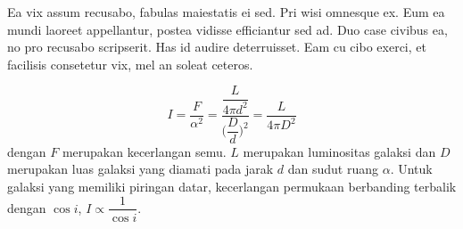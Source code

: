 	Ea vix assum recusabo, fabulas maiestatis ei sed. Pri wisi omnesque ex. Eum ea mundi laoreet appellantur, postea vidisse efficiantur sed ad. Duo case civibus ea, no pro recusabo scripserit. Has id audire deterruisset. Eam cu cibo exerci, et facilisis consetetur vix, mel an soleat ceteros.

\begin{equation} \label{kecerlangan}
I=\dfrac{F}{\alpha^{2}}=\dfrac{\dfrac{L}{4 \pi d^{2}}}{\bigg(\dfrac{D}{d} \bigg)^{2}}=\dfrac{L}{4 \pi D^{2}}
\end{equation}
dengan  $F$ merupakan kecerlangan semu. $L$ merupakan luminositas galaksi dan $D$ merupakan luas galaksi yang diamati pada jarak $d$ dan sudut ruang $\alpha$. Untuk galaksi yang memiliki piringan datar, kecerlangan permukaan berbanding terbalik dengan $\cos i$, $I \propto \dfrac{1}{\cos i}$. \\

	